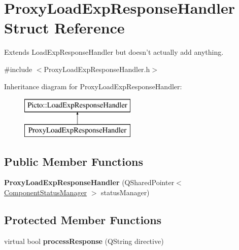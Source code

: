 \hypertarget{struct_proxy_load_exp_response_handler}{\section{Proxy\-Load\-Exp\-Response\-Handler Struct Reference}
\label{struct_proxy_load_exp_response_handler}
}


Extends Load\-Exp\-Response\-Handler but doesn't actually add anything.  




{\ttfamily \#include $<$Proxy\-Load\-Exp\-Response\-Handler.\-h$>$}

Inheritance diagram for Proxy\-Load\-Exp\-Response\-Handler\-:\begin{figure}[H]
\begin{center}
\leavevmode
\includegraphics[height=2.000000cm]{struct_proxy_load_exp_response_handler}
\end{center}
\end{figure}
\subsection*{Public Member Functions}
\begin{DoxyCompactItemize}
\item 
\hypertarget{struct_proxy_load_exp_response_handler_a95127d90716111f1996ad88e4b131428}{{\bfseries Proxy\-Load\-Exp\-Response\-Handler} (Q\-Shared\-Pointer$<$ \hyperlink{class_component_status_manager}{Component\-Status\-Manager} $>$ status\-Manager)}\label{struct_proxy_load_exp_response_handler_a95127d90716111f1996ad88e4b131428}

\end{DoxyCompactItemize}
\subsection*{Protected Member Functions}
\begin{DoxyCompactItemize}
\item 
\hypertarget{struct_proxy_load_exp_response_handler_ada75245686c080b13465eb6509a63616}{virtual bool {\bfseries process\-Response} (Q\-String directive)}\label{struct_proxy_load_exp_response_handler_ada75245686c080b13465eb6509a63616}

\end{DoxyCompactItemize}


